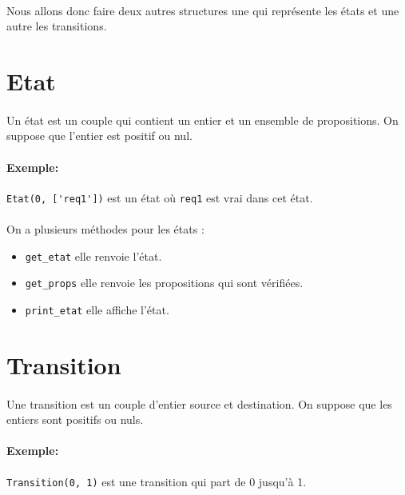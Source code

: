 \documentclass[12pt,a4paper]{report}
\begin{document}
\paragraph{}Nous allons donc faire deux autres structures une qui représente les états et une autre les transitions.

\section*{Etat}

\paragraph{}Un état est un couple qui contient un entier et un ensemble de propositions. On suppose que l'entier est positif ou nul.

\paragraph{Exemple:}\verb+Etat(0, ['req1'])+ est un état où \verb+req1+ est vrai dans cet état.

\paragraph{}On a plusieurs méthodes pour les états :
\begin{itemize}
    \item \verb+get_etat+ elle renvoie l'état.
    \item \verb+get_props+ elle renvoie les propositions qui sont vérifiées.
    \item \verb+print_etat+ elle affiche l'état.
\end{itemize}

\section*{Transition}

\paragraph{}Une transition est un couple d'entier source et destination. On suppose que les entiers sont positifs ou nuls.

\paragraph{Exemple:}\verb+Transition(0, 1)+ est une transition qui part de 0 jusqu'à 1.
\end{document}
